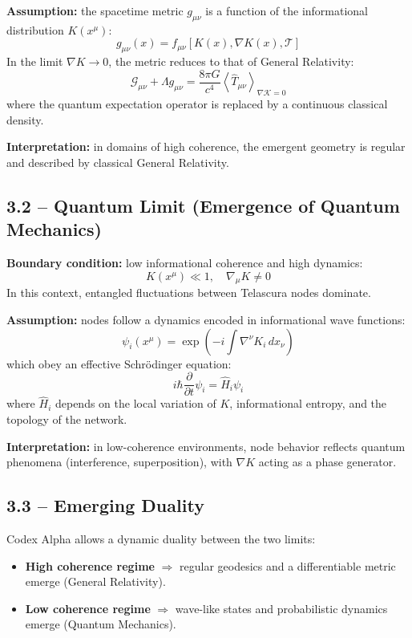 \documentclass[12pt]{article}
\begin{document}
\textbf{Assumption:} the spacetime metric $g_{\mu\nu}$ is a function of the informational distribution $K(x^\mu)$:
\[
g_{\mu\nu}(x) = f_{\mu\nu}[K(x), \nabla K(x), \mathcal{T}]
\]
In the limit $\nabla K \rightarrow 0$, the metric reduces to that of General Relativity:
\[
\mathcal{G}_{\mu\nu} + \Lambda g_{\mu\nu} = \frac{8\pi G}{c^4} \left\langle \hat{T}_{\mu\nu} \right\rangle_{\nabla \mathcal{K} = 0}
\]
where the quantum expectation operator is replaced by a continuous classical density.

\textbf{Interpretation:} in domains of high coherence, the emergent geometry is regular and described by classical General Relativity.

\subsection*{3.2 – Quantum Limit (Emergence of Quantum Mechanics)}

\textbf{Boundary condition:} low informational coherence and high dynamics:
\[
K(x^\mu) \ll 1, \quad \nabla_\mu K \neq 0
\]
In this context, entangled fluctuations between Telascura nodes dominate.

\textbf{Assumption:} nodes follow a dynamics encoded in informational wave functions:
\[
\psi_i(x^\mu) = \exp\left(-i \int \nabla^\nu K_i \, dx_\nu\right)
\]
which obey an effective Schrödinger equation:
\[
i\hbar \frac{\partial}{\partial t} \psi_i = \hat{H}_i \psi_i
\]
where $\hat{H}_i$ depends on the local variation of $K$, informational entropy, and the topology of the network.

\textbf{Interpretation:} in low-coherence environments, node behavior reflects quantum phenomena (interference, superposition), with $\nabla K$ acting as a phase generator.

\subsection*{3.3 – Emerging Duality}

Codex Alpha allows a dynamic duality between the two limits:

\begin{itemize}
  \item \textbf{High coherence regime} $\Rightarrow$ regular geodesics and a differentiable metric emerge (General Relativity).
  \item \textbf{Low coherence regime} $\Rightarrow$ wave-like states and probabilistic dynamics emerge (Quantum Mechanics).
\end{itemize}
\end{document}

